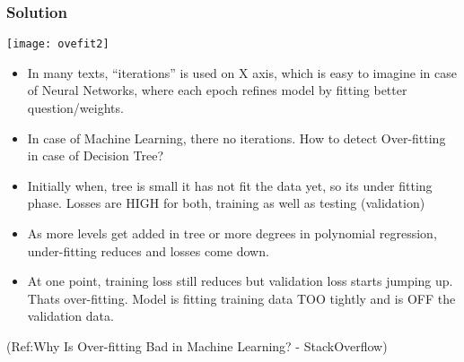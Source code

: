 \begin{frame}[fragile]\frametitle{Solution}

\begin{center}
\texttt{[image: ovefit2]}
\end{center}

	\begin{itemize}
	\item In many texts, ``iterations'' is used on X axis, which is easy to imagine in case of Neural Networks, where each epoch refines model by fitting better question/weights.
	\item In case of Machine Learning, there no iterations. How to detect Over-fitting in case of Decision Tree?
	\item Initially when, tree is small it has not fit the data yet, so its under fitting phase. Losses are HIGH for both, training as well as testing (validation)
	\item As more levels get added in tree or more degrees in polynomial regression, under-fitting reduces and losses come down.
	\item At one point, training loss still reduces but validation loss starts jumping up. Thats over-fitting. Model is fitting training data TOO tightly and is OFF the validation data.
	\end{itemize}
	
(Ref:Why Is Over-fitting Bad in Machine Learning? - StackOverflow)
\end{frame}




